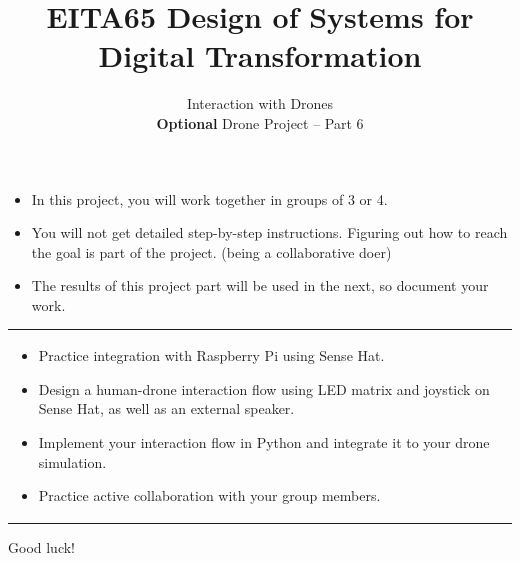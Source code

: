 \documentclass{article}
\title{EITA65 Design of Systems for Digital Transformation\\\year}
\author{\huge Interaction with Drones\\\textbf{Optional} Drone Project -- Part 6}
\begin{document}
\clearpage\maketitle
\thispagestyle{empty}%

\begin{itemize}
\item In this project, you will work together in groups  of 3 or 4.  
\item You will not get detailed step-by-step instructions. Figuring out how to reach the goal is part of the project. (being a collaborative doer)
\item The results of this project part will be used in the next, so document your work.
\end{itemize}

\vspace{.1cm}
\begin{center}
\begin{tabular}{l}
\toprule[1.5pt]
\parbox{0.8\linewidth}{
\vspace{.2cm}{\Large Learning goals:}
\begin{itemize}
    \item Practice integration with Raspberry Pi using Sense Hat.
    \item Design a human-drone interaction flow using LED matrix and joystick on Sense Hat, as well as an external speaker. 
    \item Implement your interaction flow in Python and integrate it to your drone simulation.
    \item Practice active collaboration with your group members.
\end{itemize}}\\
\bottomrule[1.5pt]
\end{tabular}
\end{center}



\vfill
\begin{center}
\huge Good luck!
\end{center}
\vspace{2cm}
\end{document}
